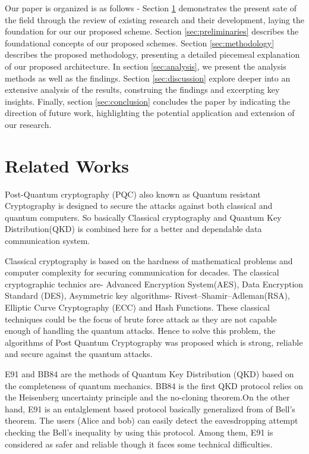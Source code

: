 \documentclass{article}
\begin{document}
Our paper is organized is as follows - Section \ref{sec:relatedWorks} demonstrates the present sate of the field through the review of existing research and their development, laying the foundation for our our proposed scheme. Section \ref{sec:preliminaries} describes the foundational concepts of our proposed schemes. Section \ref{sec:methodology} describes the proposed methodology, presenting a detailed piecemeal explanation of our proposed architecture. In section \ref{sec:analysis}, we present the analysis methods as well as the findings. Section \ref{sec:discussion} explore deeper into an extensive analysis of the results, construing the findings and excerpting key insights. Finally, section \ref{sec:conclusion} concludes the paper by indicating the direction of future work, highlighting the potential application and extension of our research.
\section{Related Works}
\label{sec:relatedWorks}
Post-Quantum cryptography (PQC) also known as Quantum resistant Cryptography is designed to secure the attacks against both classical and quantum computers. So basically Classical cryptography and Quantum Key Distribution(QKD) is combined here for a better and dependable data communication system.

Classical cryptography is based on the hardness of mathematical problems and computer complexity for securing communication for decades. The classical cryptographic technics are- Advanced Encryption System(AES), Data Encryption Standard (DES), Asymmetric key algorithms- Rivest–Shamir–Adleman(RSA), Elliptic Curve Cryptography (ECC) and Hash Functions. These classical techniques could be the focus of brute force attack as they are not capable enough of handling the quantum attacks. Hence to solve this problem, the algorithms of Post Quantum Cryptography was proposed which is strong, reliable and secure against the quantum attacks.\cite{sharma2023post}

E91 and BB84 are the methods of Quantum Key Distribution (QKD) based on the completeness of quantum mechanics. BB84 is the first QKD protocol relies on the Heisenberg uncertainty principle and the no-cloning theorem.On the other hand,  E91 is an entalglement based protocol basically generalized from of Bell’s theorem. The users (Alice and bob) can easily detect the eavesdropping attempt checking the Bell’s inequality by using this protocol. \cite{ekert1991quantum} Among them, E91 is considered as safer and reliable though it faces some technical difficulties.\cite{alvarez2016comparison}
\end{document}
